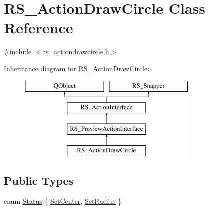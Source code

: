 \hypertarget{classRS__ActionDrawCircle}{\section{R\-S\-\_\-\-Action\-Draw\-Circle Class Reference}
\label{classRS__ActionDrawCircle}
}


{\ttfamily \#include $<$rs\-\_\-actiondrawcircle.\-h$>$}

Inheritance diagram for R\-S\-\_\-\-Action\-Draw\-Circle\-:\begin{figure}[H]
\begin{center}
\leavevmode
\includegraphics[height=4.000000cm]{classRS__ActionDrawCircle}
\end{center}
\end{figure}
\subsection*{Public Types}
\begin{DoxyCompactItemize}
\item 
enum \hyperlink{classRS__ActionDrawCircle_ade536243e0f8abb2e15795591b9c2f0d}{Status} \{ \hyperlink{classRS__ActionDrawCircle_ade536243e0f8abb2e15795591b9c2f0da07fab13389e7a57997040dd0beb64b24}{Set\-Center}, 
\hyperlink{classRS__ActionDrawCircle_ade536243e0f8abb2e15795591b9c2f0dae64f4d403f7705b2fc622feac276c2e2}{Set\-Radius}
 \}
\end{DoxyCompactItemize}
